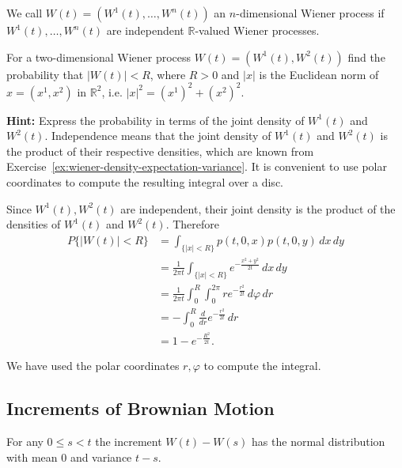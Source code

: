 \begin{Definition}
\label{def:n-dimensional-wiener}
We call $W(t) = (W^1(t), \ldots, W^n(t))$ an $n$-dimensional Wiener process if $W^1(t), \ldots, W^n(t)$ are independent $\mathbb{R}$-valued Wiener processes.
\end{Definition}

\begin{Exercise}
\label{ex:2d-wiener-probability}
For a two-dimensional Wiener process $W(t) = (W^1(t), W^2(t))$ find the probability that $|W(t)| < R$, where $R > 0$ and $|x|$ is the Euclidean norm of $x = (x^1, x^2)$ in $\mathbb{R}^2$, i.e. $|x|^2 = (x^1)^2 + (x^2)^2$.

\noindent\textbf{Hint:} Express the probability in terms of the joint density of $W^1(t)$ and $W^2(t)$. Independence means that the joint density of $W^1(t)$ and $W^2(t)$ is the product of their respective densities, which are known from Exercise~\ref{ex:wiener-density-expectation-variance}. It is convenient to use polar coordinates to compute the resulting integral over a disc.
\end{Exercise}

\begin{Solution}
Since $W^1(t), W^2(t)$ are independent, their joint density is the product of the densities of $W^1(t)$ and $W^2(t)$. Therefore
\begin{equation}
\begin{aligned}
P\{|W(t)| < R\} &= \int_{\{|x| < R\}} p(t, 0, x) p(t, 0, y) \, dx \, dy \\
&= \frac{1}{2\pi t} \int_{\{|x| < R\}} e^{-\frac{x^2+y^2}{2t}} \, dx \, dy \\
&= \frac{1}{2\pi t} \int_0^R \int_0^{2\pi} r e^{-\frac{r^2}{2t}} \, d\varphi \, dr \\
&= -\int_0^R \frac{d}{dr} e^{-\frac{r^2}{2t}} \, dr \\
&= 1 - e^{-\frac{R^2}{2t}}.
\end{aligned}
\end{equation}

We have used the polar coordinates $r, \varphi$ to compute the integral.
\end{Solution}

\subsection{Increments of Brownian Motion}
\label{sec:brownian-increments}

\begin{Proposition}
\label{prop:wiener-increments-normal}
For any $0 \leq s < t$ the increment $W(t) - W(s)$ has the normal distribution with mean 0 and variance $t - s$.
\end{Proposition}

